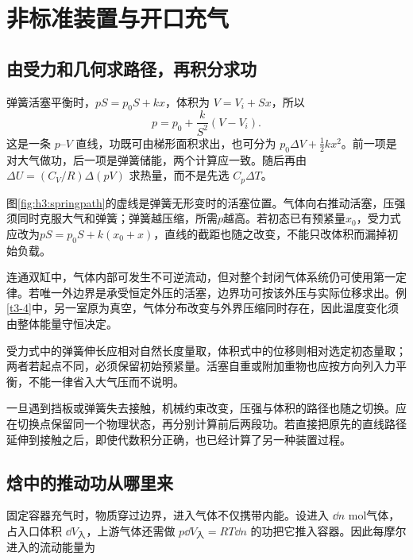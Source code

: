 \section{非标准装置与开口充气}
\subsection{由受力和几何求路径，再积分求功}
弹簧活塞平衡时，$pS=p_0S+kx$，体积为 $V=V_i+Sx$，所以
\[p=p_0+\frac{k}{S^2}(V-V_i).
\]
这是一条 $p$--$V$ 直线，功既可由梯形面积求出，也可分为 $p_0\Delta V+\frac12kx^2$。前一项是对大气做功，后一项是弹簧储能，两个计算应一致。随后再由 $\Delta U=(C_V/R)\Delta(pV)$ 求热量，而不是先选 $C_p\Delta T$。

图\ref{fig:h3:springpath}的虚线是弹簧无形变时的活塞位置。气体向右推动活塞，压强须同时克服大气和弹簧；弹簧越压缩，所需$p$越高。若初态已有预紧量$x_0$，受力式应改为$pS=p_0S+k(x_0+x)$，直线的截距也随之改变，不能只改体积而漏掉初始负载。



连通双缸中，气体内部可发生不可逆流动，但对整个封闭气体系统仍可使用第一定律。若唯一外边界是承受恒定外压的活塞，边界功可按该外压与实际位移求出。例\ref{t3-4}中，另一室原为真空，气体分布改变与外界压缩同时存在，因此温度变化须由整体能量守恒决定。


受力式中的弹簧伸长应相对自然长度量取，体积式中的位移则相对选定初态量取；两者若起点不同，必须保留初始预紧量。活塞自重或附加重物也应按方向列入力平衡，不能一律省入大气压而不说明。


一旦遇到挡板或弹簧失去接触，机械约束改变，压强与体积的路径也随之切换。应在切换点保留同一个物理状态，再分别计算前后两段功。若直接把原先的直线路径延伸到接触之后，即使代数积分正确，也已经计算了另一种装置过程。

\subsection{焓中的推动功从哪里来}
固定容器充气时，物质穿过边界，进入气体不仅携带内能。设进入 $\dd n$ mol气体，占入口体积 $\dd V_{\text{入}}$，上游气体还需做 $p\dd V_{\text{入}}=RT\dd n$ 的功把它推入容器。因此每摩尔进入的流动能量为

